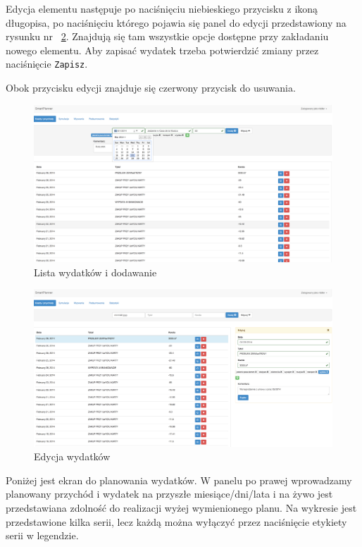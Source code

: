 \documentclass[10pt,titlepage]{article}
\begin{document}
\par Edycja elementu następuje po naciśnięciu niebieskiego przycisku z ikoną długopisa, po naciśnięciu którego pojawia się panel do edycji przedstawiony na rysunku nr ~\ref{screen:editExpense}. Znajdują się tam wszystkie opcje dostępne przy zakładaniu nowego elementu. Aby zapisać wydatek trzeba potwierdzić zmiany przez naciśnięcie \verb|Zapisz|.
\par Obok przycisku edycji znajduje się czerwony przycisk do usuwania.
\begin{figure}[H]
  \centering
  \includegraphics[scale=0.2]{images/screen_dodawaniewydatkow.png}
  \caption{Lista wydatków i dodawanie}
  \label{screen:listExpense}
\end{figure}
\begin{figure}[H]
  \centering
  \includegraphics[scale=0.2]{images/screen_edycjaWydatku.png}
  \caption{Edycja wydatków}
  \label{screen:editExpense}
\end{figure}
\par Poniżej jest ekran do planowania wydatków. W panelu po prawej wprowadzamy planowany przychód i wydatek na przyszłe miesiące/dni/lata i na żywo jest przedstawiana zdolność do realizacji wyżej wymienionego planu. Na wykresie jest przedstawione kilka serii, lecz każdą można wyłączyć przez naciśnięcie etykiety serii w legendzie.
\end{document}
